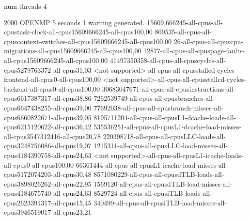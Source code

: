 num threads 4

2000
OPENMP
5 seconds
1 warning generated.
15609,666245-all-cpus-all-cpustask-clock-all-cpus15609666245-all-cpus100,00
809535-all-cpus-all-cpuscontext-switches-all-cpus15609666245-all-cpus100,00
26-all-cpus-all-cpuscpu-migrations-all-cpus15609666245-all-cpus100,00
12877-all-cpus-all-cpuspage-faults-all-cpus15609666245-all-cpus100,00
41497350358-all-cpus-all-cpuscycles-all-cpus5279763372-all-cpus31,03
<not supported>-all-cpus-all-cpusstalled-cycles-frontend-all-cpus0-all-cpus100,00
<not supported>-all-cpus-all-cpusstalled-cycles-backend-all-cpus0-all-cpus100,00
30683047671-all-cpus-all-cpusinstructions-all-cpus6617387317-all-cpus38,86
7262539749-all-cpus-all-cpusbranches-all-cpus6647438255-all-cpus39,00
77692038-all-cpus-all-cpusbranch-misses-all-cpus6660822671-all-cpus39,05
8195711204-all-cpus-all-cpusL1-dcache-loads-all-cpus6215120622-all-cpus36,42
535536251-all-cpus-all-cpusL1-dcache-load-misses-all-cpus3547312416-all-cpus20,78
220398718-all-cpus-all-cpusLLC-loads-all-cpus3248756086-all-cpus19,07
1215311-all-cpus-all-cpusLLC-load-misses-all-cpus4184390758-all-cpus24,63
<not supported>-all-cpus-all-cpusL1-icache-loads-all-cpus0-all-cpus100,00
66361444-all-cpus-all-cpusL1-icache-load-misses-all-cpus5172074203-all-cpus30,48
8571080229-all-cpus-all-cpusdTLB-loads-all-cpus3898026262-all-cpus22,95
1569120-all-cpus-all-cpusdTLB-load-misses-all-cpus4184675740-all-cpus24,63
8529724-all-cpus-all-cpusiTLB-loads-all-cpus2623391317-all-cpus15,45
340499-all-cpus-all-cpusiTLB-load-misses-all-cpus3946519017-all-cpus23,21
